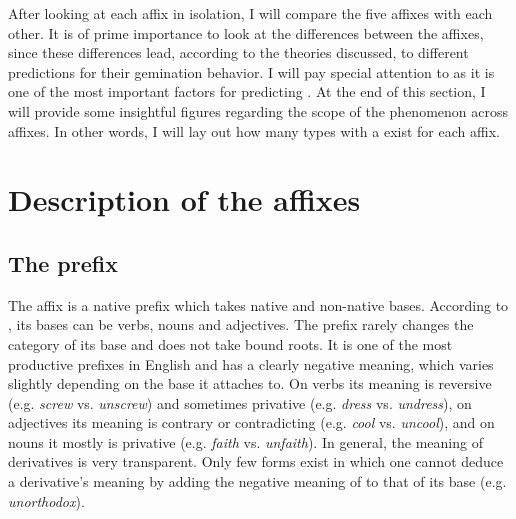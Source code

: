 After looking at each affix in isolation, I will compare the five affixes with each other. It is of prime importance to look at the differences between the affixes, since these differences lead, according to the theories discussed, to different predictions for their gemination behavior. I will pay special attention to  as it is one of the most important factors for predicting .  
At the end of this section, I will provide some insightful figures regarding the scope of the phenomenon across affixes. In other words, I will lay out how many types with a  exist for each affix.

\section{Description of the affixes}

\subsection{The prefix } {\label{description un}}

The affix  is a native prefix which takes native and non-native bases. According to \citet[ 355, 361, 371ff.]{Bauer.2013}, its bases can be verbs, nouns and adjectives. The prefix rarely changes the category of its base and does not take bound roots. It is one of the most productive prefixes in English and has a clearly negative meaning, which varies slightly depending on the base it attaches to. On verbs its meaning is reversive (e.g. \textit{screw} vs. \textit{unscrew}) and sometimes privative (e.g. \textit{dress} vs. \textit{undress}), on adjectives its meaning is contrary or contradicting (e.g. \textit{cool} vs. \textit{uncool}), and on nouns it mostly is privative (e.g. \textit{faith} vs. \textit{unfaith}).
In general, the meaning of derivatives is very transparent. Only few forms exist in which one cannot deduce a derivative's meaning by adding the negative meaning of  to that of its base (e.g. \textit{unorthodox}).

